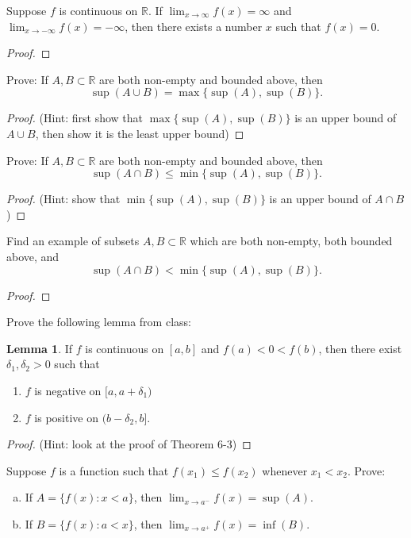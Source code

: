 \documentclass{article} %
\theoremstyle{plain}
\theoremstyle{definition}
\newtheorem*{lemma*}{Lemma}
\newcommand{\Rb}{\mathbb{R}}
\begin{document}
\noindent{} Suppose $f$ is continuous on $\Rb$. If $\lim_{x \rightarrow\infty} f(x) = \infty$ and $\lim_{x \rightarrow -\infty} f(x)=-\infty$, then there exists a number $x$ such that $f(x)=0$. 


\begin{proof} 
\end{proof} 

\noindent{} Prove: If $A,B \subset \Rb$ are both non-empty and bounded above, then 
$$
\sup(A \cup B) = \max\{\sup(A), \sup(B)\}.
$$


\begin{proof} (Hint: first show that $ \max\{\sup(A), \sup(B)\}$ is an upper bound of $A \cup B$, then show it is the least upper bound)
\end{proof} 

\noindent{} Prove: If $A,B \subset \Rb$ are both non-empty and bounded above, then 
$$
\sup(A \cap B) \leq \min\{\sup(A), \sup(B)\}.
$$


\begin{proof} (Hint: show that $\min\{\sup(A), \sup(B)\}$ is an upper bound of $A \cap B$) 
\end{proof} 

\noindent{} Find an example of subsets $A,B \subset \Rb$ which are both non-empty, both bounded above, and 
$$
\sup(A \cap B) < \min\{\sup(A), \sup(B)\}.
$$


\begin{proof} 
\end{proof} 



\noindent{} Prove the following lemma from class:

\begin{lemma*} If $f$ is continuous on $[a,b]$ and $f(a) < 0 < f(b)$, then there exist $\delta_1, \delta_2 > 0$ such that 
	\begin{enumerate}
		\item $f$ is negative on $[a,a+\delta_1)$
		\item $f$ is positive on $(b-\delta_2, b]$.
	\end{enumerate}
\end{lemma*}

\begin{proof} (Hint: look at the proof of Theorem 6-3) 
\end{proof} 

\noindent{} Suppose $f$ is a function such that $f(x_1) \leq f(x_2)$ whenever $x_1< x_2$. Prove: 
\begin{enumerate}[(a)]
	\item If $A = \{ f(x) : x < a\}$, then $\lim_{x \rightarrow a^-} f(x) = \sup(A)$.
	\item If $B = \{ f(x) : a < x\}$, then $\lim_{x \rightarrow a^+} f(x) = \inf(B)$.
\end{enumerate}
\end{document}
